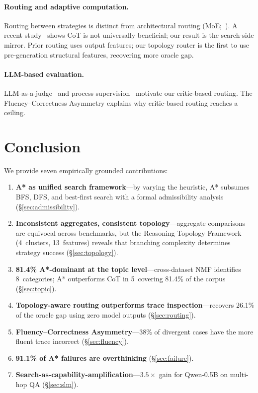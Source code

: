 \documentclass[11pt]{article}
\begin{document}
\paragraph{Routing and adaptive computation.}
Routing between strategies is distinct from architectural routing (MoE;~\citealt{shazeer2017outrageously}). A recent study~\citep{meincke2025decreasing} shows CoT is not universally beneficial; our result is the search-side mirror. Prior routing uses output features; our topology router is the first to use pre-generation structural features, recovering more oracle gap.

\paragraph{LLM-based evaluation.}
LLM-as-a-judge~\citep{zheng2023judging} and process supervision~\citep{lightman2023lets} motivate our critic-based routing. The Fluency--Correctness Asymmetry explains why critic-based routing reaches a ceiling.

\section{Conclusion}
\label{sec:conclusion}

We provide seven empirically grounded contributions:

\begin{enumerate}[leftmargin=1.5em,itemsep=3pt]
\item \textbf{A* as unified search framework}---by varying the heuristic, A* subsumes BFS, DFS, and best-first search with a formal admissibility analysis (\S\ref{sec:admissibility}).
\item \textbf{Inconsistent aggregates, consistent topology}---aggregate comparisons are equivocal across benchmarks, but the Reasoning Topology Framework (4~clusters, 13~features) reveals that branching complexity determines strategy success (\S\ref{sec:topology}).
\item \textbf{81.4\% A*-dominant at the topic level}---cross-dataset NMF identifies 8~categories; A* outperforms CoT in 5~covering 81.4\% of the corpus (\S\ref{sec:topic}).
\item \textbf{Topology-aware routing outperforms trace inspection}---recovers 26.1\% of the oracle gap using zero model outputs (\S\ref{sec:routing}).
\item \textbf{Fluency--Correctness Asymmetry}---38\% of divergent cases have the more fluent trace incorrect (\S\ref{sec:fluency}).
\item \textbf{91.1\% of A* failures are overthinking} (\S\ref{sec:failure}).
\item \textbf{Search-as-capability-amplification}---$3.5\times$ gain for Qwen-0.5B on multi-hop QA (\S\ref{sec:slm}).
\end{enumerate}
\end{document}
